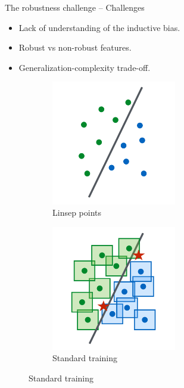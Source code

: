 \begin{frame}{The robustness challenge -- Challenges}
	\begin{itemize}
		\item Lack of understanding of the inductive bias.
		\item Robust vs non-robust features.
		\item Generalization-complexity trade-off.
	\end{itemize}

	\begin{figure}
		\centering
		\begin{subfigure}[t]{0.32\textwidth}
			\includegraphics[width=0.6\textwidth]{img/introduction/adversarial_complexity_1.png}
			\caption{Linsep points}
		\end{subfigure}
		\hfill
		\begin{subfigure}[t]{0.32\textwidth}
			\centering
			\includegraphics[width=0.6\textwidth]{img/introduction/adversarial_complexity_2.png}
			\caption{Standard training}
		\end{subfigure}

\end{figure}
\end{frame}
